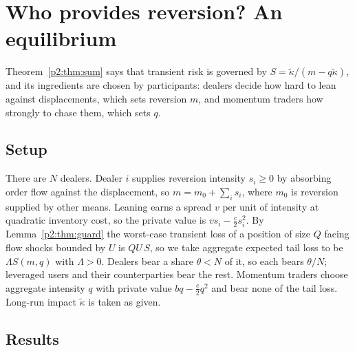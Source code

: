    \section{Who provides reversion? An equilibrium}\label{p2:sec:equil}

    Theorem~\ref{p2:thm:sum} says that transient risk is governed by $S=\tilde\kappa/(m-q\tilde\kappa)$, and its ingredients are chosen by participants: dealers decide how hard to lean against displacements, which sets reversion $m$, and momentum traders how strongly to chase them, which sets $q$.
    
\subsection{Setup}
There are $N$ dealers. Dealer $i$ supplies reversion intensity $s_i\ge0$ by absorbing order flow against the displacement, so $m=m_0+\sum_is_i$, where $m_0$ is reversion supplied by other means. Leaning earns a spread $v$ per unit of intensity at quadratic inventory cost, so the private value is $vs_i-\tfrac c2s_i^2$. By Lemma~\ref{p2:thm:guard} the worst-case transient loss of a position of size $Q$ facing flow shocks bounded by $U$ is $QU\,S$, so we take aggregate expected tail loss to be $\Lambda S(m,q)$ with $\Lambda>0$. Dealers bear a share $\theta<N$ of it, so each bears $\theta/N$; leveraged users and their counterparties bear the rest. Momentum traders choose aggregate intensity $q$ with private value $bq-\tfrac e2q^2$ and bear none of the tail loss. Long-run impact $\tilde\kappa$ is taken as given.

\subsection{Results}

